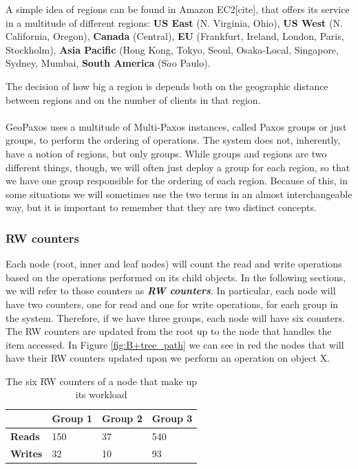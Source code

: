 A simple idea of regions can be found in Amazon EC2[cite], that offers its service in a multitude of different regions: \textbf{US East} (N. Virginia, Ohio), \textbf{US West} (N. California, Oregon), \textbf{Canada} (Central), \textbf{EU} (Frankfurt, Ireland, London, Paris, Stockholm), \textbf{Asia Pacific} (Hong Kong, Tokyo, Seoul, Osaka-Local, Singapore, Sydney, Mumbai, \textbf{South America} (S$\tilde{a}$o Paulo).

The decision of how big a region is depends both on the geographic distance between regions and on the number of clients in that region.\\\\
GeoPaxos uses a multitude of Multi-Paxos instances, called Paxos groups or just groups, to perform the ordering of operations. The system does not, inherently, have a notion of regions, but only groups. While groups and regions are two different things, though, we will often just deploy a group for each region, so that we have one group responsible for the ordering of each region. Because of this, in some situations we will sometimes use the two terms in an almost interchangeable way, but it is important to remember that they are two distinct concepts.

\subsubsection{RW counters}
Each node (root, inner and leaf nodes) will count the read and write operations based on the operations performed on its child objects. In the following sections, we will refer to those counters as \textbf{\emph{RW counters}}. In particular, each node will have two counters, one for read and one for write operations, for each group in the system. Therefore, if we have three groups, each node will have six counters. The RW counters are updated from the root up to the node that handles the item accessed. In Figure \ref{fig:B+tree_path} we can see in red the nodes that will have their RW counters updated upon we perform an operation on object X. 

\begin{table}[!htb]
  \centering
  \begin{tabular}{l l l l}
    \hline
    & \textbf{Group 1} & \textbf{Group 2} & \textbf{Group 3} \\
    \hline
    \textbf{Reads} & 150 & 37 & 540 \\
    \textbf{Writes} & 32 & 10 & 93 \\
    \hline
  \end{tabular}
  \caption{The six RW counters of a node that make up its workload}\label{tab:workload-example}
\end{table}

